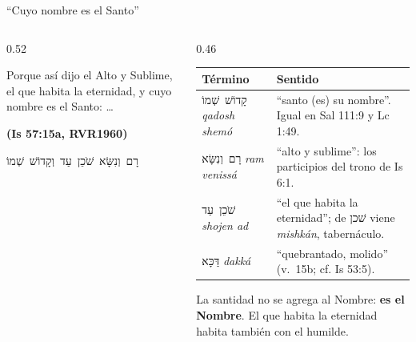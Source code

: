 \documentclass[hyperref={bookmarks=false},aspectratio=169]{beamer}
\newcommand{\heb}[1]{\mbox{\foreignlanguage{hebrew}{#1}}}
\newcommand{\fuente}[1]{\par\hfill{\upshape\bfseries\footnotesize\textcolor{azul}{#1}}}
\newcommand{\destacar}[1]{\textbf{\textcolor{azul}{#1}}}
\begin{document}
\begin{frame}{``Cuyo nombre es el Santo''}
\begin{columns}[c,onlytextwidth]
\begin{column}{0.52\textwidth}
\begin{cita}Porque así dijo el Alto y Sublime, el que habita la eternidad, y cuyo nombre es el Santo: \ldots\fuente{(Is 57:15a, RVR1960)}\end{cita}
\begin{center}\small\heb{רָם וְנִשָּׂא שֹׁכֵן עַד וְקָדוֹשׁ שְׁמוֹ}\end{center}
\end{column}
\begin{column}{0.46\textwidth}\scriptsize
\renewcommand{\arraystretch}{1.2}
\begin{tabular}{@{}>{\RaggedRight\arraybackslash}p{1.9cm}>{\RaggedRight\arraybackslash}p{3.7cm}@{}}
\toprule
\textbf{Término} & \textbf{Sentido} \\ \midrule
\heb{קָדוֹשׁ שְׁמוֹ} \emph{qadosh shemó} & ``santo (es) su nombre''. Igual en Sal 111:9 y Lc 1:49. \\
\heb{רָם וְנִשָּׂא} \emph{ram venissá} & ``alto y sublime'': los participios del trono de Is 6:1. \\
\heb{שֹׁכֵן עַד} \emph{shojen ad} & ``el que habita la eternidad''; de \heb{שׁכן} viene \emph{mishkán}, tabernáculo. \\
\heb{דַּכָּא} \emph{dakká} & ``quebrantado, molido'' (v.~15b; cf. Is 53:5). \\
\bottomrule
\end{tabular}\par\medskip
\small La santidad no se agrega al Nombre: \destacar{es el Nombre}. El que habita la eternidad habita también con el humilde.
\end{column}
\end{columns}
\end{frame}
\end{document}
